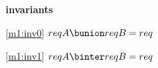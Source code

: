 \textbf{invariants}
\begin{block}
\item[ \eqref{m1:inv0} ]{$reqA \bunion reqB = req$} %
\item[ \eqref{m1:inv1} ]{$reqA \binter reqB = req$} %
\end{block}
